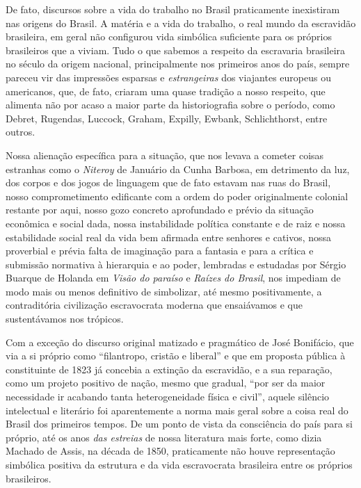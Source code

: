 De fato, discursos sobre a vida do trabalho no Brasil praticamente
inexistiram nas origens do Brasil. A matéria e a vida do trabalho, o
real mundo da escravidão brasileira, em geral não configurou vida
simbólica suficiente para os próprios brasileiros que a viviam. Tudo o
que sabemos a respeito da escravaria brasileira no século da origem
nacional, principalmente nos primeiros anos do país, sempre pareceu vir
das impressões esparsas e \emph{estrangeiras} dos viajantes europeus ou
americanos, que, de fato, criaram uma quase tradição a nosso respeito,
que alimenta não por acaso a maior parte da historiografia sobre o
período, como Debret, Rugendas, Luccock, Graham, Expilly, Ewbank,
Schlichthorst, entre outros.

Nossa alienação específica para a situação, que nos levava a cometer
coisas estranhas como o \emph{Niteroy} de Januário da Cunha Barbosa, em
detrimento da luz, dos corpos e dos jogos de linguagem que de fato
estavam nas ruas do Brasil, nosso comprometimento edificante com a ordem
do poder originalmente colonial restante por aqui, nosso gozo concreto
aprofundado e prévio da situação econômica e social dada, nossa
instabilidade política constante e de raiz e nossa estabilidade social
real da vida bem afirmada entre senhores e cativos, nossa proverbial e
prévia falta de imaginação para a fantasia e para a crítica e submissão
normativa à hierarquia e ao poder, lembradas e estudadas por Sérgio
Buarque de Holanda em \emph{Visão do paraíso} e \emph{Raízes do Brasil},
nos impediam de modo mais ou menos definitivo de simbolizar, até mesmo
positivamente, a contraditória civilização escravocrata moderna que
ensaiávamos e que sustentávamos nos trópicos.

Com a exceção do discurso original matizado e pragmático de José
Bonifácio, que via a si próprio como ``filantropo, cristão e liberal'' e
que em proposta pública à constituinte de 1823 já concebia a extinção da
escravidão, e a sua reparação, como um projeto positivo de nação, mesmo
que gradual, ``por ser da maior necessidade ir acabando tanta
heterogeneidade física e civil'', aquele silêncio intelectual e
literário foi aparentemente a norma mais geral sobre a coisa real do
Brasil dos primeiros tempos. De um ponto de vista da consciência do país
para si próprio, até os anos \emph{das estreias} de nossa literatura
mais forte, como dizia Machado de Assis, na década de 1850, praticamente
não houve representação simbólica positiva da estrutura e da vida
escravocrata brasileira entre os próprios brasileiros.

